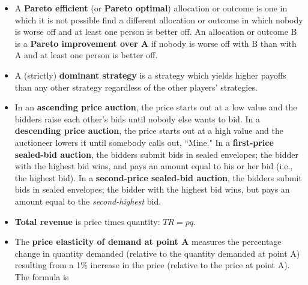 \documentclass{article}
\begin{document}
\begin{EXAM}
\begin{itemize}
\item A \textbf{Pareto efficient} (or \textbf{Pareto optimal})
allocation or outcome is one in which it is not possible find a
different allocation or outcome in which nobody is worse off and
at least one person is better off. An allocation or outcome B is a
\textbf{Pareto improvement over A} if nobody is worse off with B
than with A and at least one person is better off.

\item A (strictly) \textbf{dominant strategy} is a strategy which yields higher payoffs than any other strategy regardless of the other players' strategies. %

 
\item In an \textbf{ascending price auction}, the price starts out at a low value and the bidders raise each other's bids until nobody else wants to bid. In a \textbf{descending price auction}, the price starts out at a high value and the auctioneer lowers it until somebody calls out, ``Mine." In a \textbf{first-price sealed-bid auction}, the bidders submit bids in sealed envelopes; the bidder with the highest bid wins, and pays an amount equal to his or her bid (i.e., the highest bid). In a \textbf{second-price sealed-bid auction}, the bidders submit bids in sealed envelopes; the bidder with the highest bid wins, but pays an amount equal to the \emph{second-highest} bid.



\item \textbf{Total revenue} is price times quantity: $TR = pq$.

\item The \textbf{price elasticity of demand at point A} measures
the percentage change in quantity demanded (relative to the
quantity demanded at point A) resulting from a 1\% increase in the
price (relative to the price at point A). The formula is


\end{itemize}
\end{EXAM}
\end{document}
